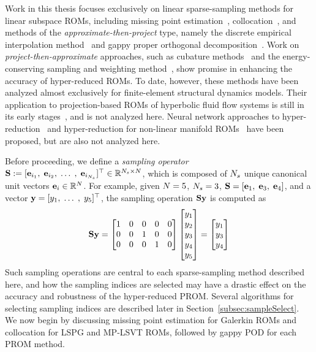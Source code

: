 Work in this thesis focuses exclusively on linear sparse-sampling methods for linear subspace ROMs, including missing point estimation~\cite{Astrid2004}, collocation~\cite{Bos2004}, and methods of the \textit{approximate-then-project} type, namely the discrete empirical interpolation method~\cite{Chaturantabut2010} and gappy proper orthogonal decomposition~\cite{Everson1995}. Work on \textit{project-then-approximate} approaches, such as cubature methods~\cite{An2008,Hernandez2017} and the energy-conserving sampling and weighting method~\cite{Farhat2014}, show promise in enhancing the accuracy of hyper-reduced ROMs. To date, however, these methods have been analyzed almost exclusively for finite-element structural dynamics models. Their application to projection-based ROMs of hyperbolic fluid flow systems is still in its early stages~\cite{Grimberg2020Hyper}, and is not analyzed here. Neural network approaches to hyper-reduction~\cite{nnHyperRed} and hyper-reduction for non-linear manifold ROMs~\cite{Kim2022} have been proposed, but are also not analyzed here.

Before proceeding, we define a \textit{sampling operator} $\mathbf{S} := [\mathbf{e}_{i_1}, \; \mathbf{e}_{i_2}, \; \hdots \;, \; \mathbf{e}_{i_{N_s}} ]^\top \in \mathbb{R}^{N_s \times N}$, which is composed of $N_s$ unique canonical unit vectors $\mathbf{e}_{i} \in \mathbb{R}^{N}$. For example, given $N = 5$, $N_s = 3$, $\mathbf{S} = [\mathbf{e}_1, \; \mathbf{e}_3, \; \mathbf{e}_4]$,
and a vector $\mathbf{y} = [y_1, \; \hdots \;, \; y_5]^\top$, the sampling operation $\mathbf{S} \mathbf{y}$ is computed as
%
\begin{equation}
	\mathbf{S} \mathbf{y} =
	\begin{bmatrix}
		1 & 0 & 0 & 0 & 0 \\
		0 & 0 & 1 & 0 & 0 \\
		0 & 0 & 0 & 1 & 0 \\
	\end{bmatrix}
	\begin{bmatrix}
		y_1 \\ y_2 \\ y_3 \\ y_4 \\ y_5
	\end{bmatrix} =
	\begin{bmatrix}
		y_1 \\ y_3 \\ y_4
	\end{bmatrix}
\end{equation}
%
Such sampling operations are central to each sparse-sampling method described here, and how the sampling indices are selected may have a drastic effect on the accuracy and robustness of the hyper-reduced PROM. Several algorithms for selecting sampling indices are described later in Section~\ref{subsec:sampleSelect}. We now begin by discussing missing point estimation for Galerkin ROMs and collocation for LSPG and MP-LSVT ROMs, followed by gappy POD for each PROM method.
